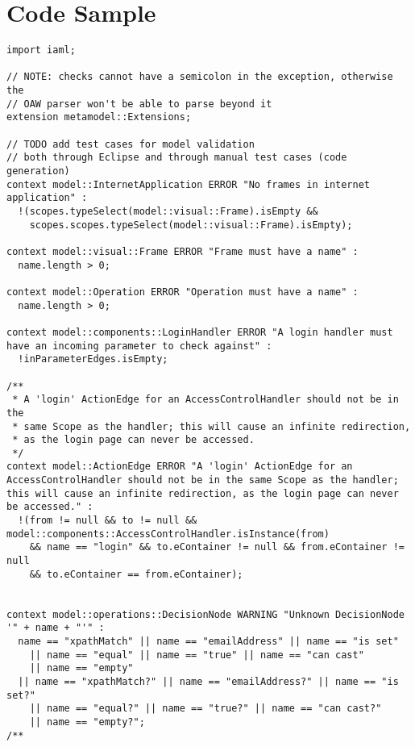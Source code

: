 \chapter{Code Sample}

\begin{verbatim}
import iaml;

// NOTE: checks cannot have a semicolon in the exception, otherwise the 
// OAW parser won't be able to parse beyond it
extension metamodel::Extensions;

// TODO add test cases for model validation
// both through Eclipse and through manual test cases (code generation)
context model::InternetApplication ERROR "No frames in internet application" :
  !(scopes.typeSelect(model::visual::Frame).isEmpty &&
    scopes.scopes.typeSelect(model::visual::Frame).isEmpty);

context model::visual::Frame ERROR "Frame must have a name" :
  name.length > 0;
  
context model::Operation ERROR "Operation must have a name" :
  name.length > 0;
  
context model::components::LoginHandler ERROR "A login handler must have an incoming parameter to check against" :
  !inParameterEdges.isEmpty;
  
/**
 * A 'login' ActionEdge for an AccessControlHandler should not be in the 
 * same Scope as the handler; this will cause an infinite redirection, 
 * as the login page can never be accessed.
 */
context model::ActionEdge ERROR "A 'login' ActionEdge for an AccessControlHandler should not be in the same Scope as the handler; this will cause an infinite redirection, as the login page can never be accessed." :
  !(from != null && to != null && model::components::AccessControlHandler.isInstance(from) 
    && name == "login" && to.eContainer != null && from.eContainer != null
    && to.eContainer == from.eContainer);
     
     
context model::operations::DecisionNode WARNING "Unknown DecisionNode '" + name + "'" :
  name == "xpathMatch" || name == "emailAddress" || name == "is set"
    || name == "equal" || name == "true" || name == "can cast"
    || name == "empty"
  || name == "xpathMatch?" || name == "emailAddress?" || name == "is set?"
    || name == "equal?" || name == "true?" || name == "can cast?"
    || name == "empty?";
/**\end{verbatim}
